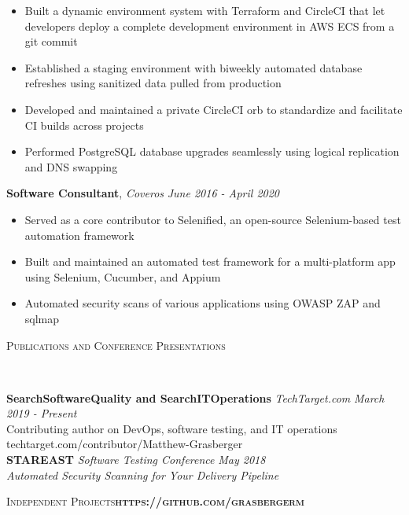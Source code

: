 \documentclass[a4paper,9pt]{extarticle}
\newenvironment{changemargin}[2]{%
  \begin{list}{}{%
    \setlength{\topsep}{0pt}%
    \setlength{\leftmargin}{#1}%
    \setlength{\rightmargin}{#2}%
    \setlength{\listparindent}{\parindent}%
    \setlength{\itemindent}{\parindent}%
    \setlength{\parsep}{\parskip}%
  }%
  \item[]}{\end{list}
}
\newcommand{\lineover}{
	\begin{changemargin}{-0.05in}{-0.05in}
		\vspace*{-8pt}
		\hrulefill \\
		\vspace*{0pt}
	\end{changemargin}
}
\newcommand{\header}[1]{
	\begin{changemargin}{-0.5in}{-0.5in}
		\scshape{#1}\\
  	\lineover
	\end{changemargin}
}
\newenvironment{body} {
	\vspace*{-10pt}
	\begin{changemargin}{-0.25in}{-0.5in}
  }	
	{\end{changemargin}
}
\begin{document}
\begin{body}
	\vspace*{0pt}
	\begin{itemize} \itemsep 3pt  %
		\item  Built a dynamic environment system with Terraform and CircleCI that let developers deploy a complete development environment in AWS ECS from a git commit
		\item  Established a staging environment with biweekly automated database refreshes using sanitized data pulled from production
		\item  Developed and maintained a private CircleCI orb to standardize and facilitate CI builds across projects
		\item  Performed PostgreSQL database upgrades seamlessly using logical replication and DNS swapping
	\end{itemize}
	\textbf{Software Consultant}, \emph{Coveros} \hfill \emph{June 2016 - April 2020}\\
	\vspace*{0pt}
	\begin{itemize} \itemsep 3pt  %
		\item  Served as a core contributor to Selenified, an open-source Selenium-based test automation framework
		\item  Built and maintained an automated test framework for a multi-platform app using Selenium, Cucumber, and Appium
		\item  Automated security scans of various applications using OWASP ZAP and sqlmap
	\end{itemize}
\end{body}
\vspace{9pt}	
\smallskip
\header{Publications and Conference Presentations}

\begin{body}
	\vspace{12pt}
        \textbf{SearchSoftwareQuality and SearchITOperations }\emph{TechTarget.com} \hfill \emph{March 2019 - Present}\\
		Contributing author on DevOps, software testing, and IT operations \hfill techtarget.com/contributor/Matthew-Grasberger\\
	\smallskip
	\vspace{4pt}
	\textbf{STAREAST }\emph{Software Testing Conference} \hfill \emph{May 2018}{}\\
	\emph{Automated Security Scanning for Your Delivery Pipeline}
	\vspace{4pt}
\end{body}
\vspace{9pt}
\smallskip
\header{Independent Projects\hfill \textbf{https://github.com/grasbergerm}}
\end{document}
